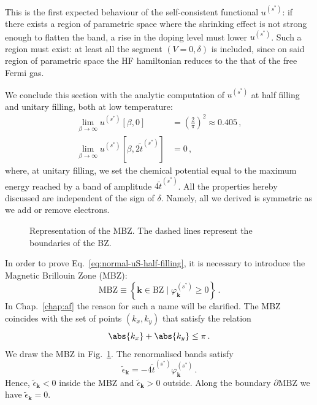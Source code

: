 This is the first expected behaviour of the self-consistent functional $u^{(s^*)}$: if there exists a region of parametric space where the shrinking effect is not strong enough to flatten the band, a rise in the doping level must lower $u^{(s^*)}$. Such a region must exist: at least all the segment $(V=0,\delta)$ is included, since on said region of parametric space the HF hamiltonian reduces to the that of the free Fermi gas.

We conclude this section with the analytic computation of $u^{(s^*)}$ at half filling and unitary filling, both at low temperature:
\begin{align}
	\lim_{\beta \to \infty} u^{(s^*)}[\beta,0] &= \left( \frac{2}{\pi} \right)^2 \approx 0.405  \, , \label{eq:normal-uS-half-filling} \\
	\lim_{\beta \to \infty} u^{(s^*)}\left[
	\beta,2\tilde{t}^{(s^*)}
	\right] &= 0 \, , \label{eq:normal-uS-unitary-filling}
\end{align}
where, at unitary filling, we set the chemical potential equal to the maximum energy reached by a band of amplitude $4\tilde{t}^{(s^*)}$. All the properties hereby discussed are independent of the sign of $\delta$. Namely, all we derived is symmetric as we add or remove electrons.

\begin{figure}
	\centering
	
	\caption{Representation of the MBZ. The dashed lines represent the boundaries of the BZ.}
	\label{fig:normal-MBZ}
\end{figure}

In order to prove Eq.~\eqref{eq:normal-uS-half-filling}, it is necessary to introduce the Magnetic Brillouin Zone (MBZ):
\begin{equation}\label{eq:MBZ-def}
	\mathrm{MBZ} \equiv \left\lbrace
	\mathbf{k}\in\mathrm{BZ}
	\mid 
	\varphi_\mathbf{k}^{(s^*)} \ge 0
	\right\rbrace \, .
\end{equation}
In Chap.~\ref{chap:af} the reason for such a name will be clarified. The MBZ coincides with the set of points $(k_x,k_y)$ that satisfy the relation
\[
	\abs{k_x} + \abs{k_y} \le \pi \, .
\]
We draw the MBZ in Fig.~\ref{fig:normal-MBZ}. The renormalised bands satisfy
\[
	\tilde{\epsilon}_\mathbf{k} = - 4 \tilde{t}^{(s^*)} \varphi_\mathbf{k}^{(s^*)} \, .
\]
Hence, $\tilde{\epsilon}_\mathbf{k}<0$ inside the MBZ and $\tilde{\epsilon}_\mathbf{k}>0$ outside. Along the boundary $\partial \mathrm{MBZ}$ we have $\tilde{\epsilon}_\mathbf{k}=0$.

